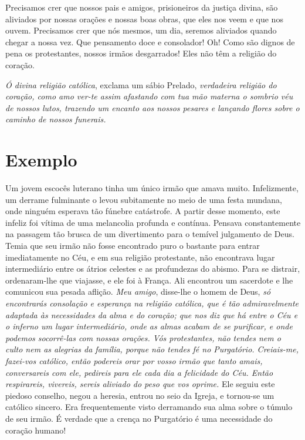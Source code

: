 Precisamos crer que nossos pais e amigos, prisioneiros da justiça divina, são aliviados por nossas orações e nossas boas obras, que eles nos veem e que nos ouvem. Precisamos crer que nós mesmos, um dia, seremos aliviados quando chegar a nossa vez. Que pensamento doce e consolador! Oh! Como são dignos de pena os protestantes, nossos irmãos desgarrados! Eles não têm a religião do coração.

\textit{Ó divina religião católica}, exclama um sábio Prelado, \textit{verdadeira religião do coração, como amo ver-te assim afastando com tua mão materna o sombrio véu de nossos lutos, trazendo um encanto aos nossos pesares e lançando flores sobre o caminho de nossos funerais.}


\section*{Exemplo}

Um jovem escocês luterano tinha um único irmão que amava muito. Infelizmente, um derrame fulminante o levou subitamente no meio de uma festa mundana, onde ninguém esperava tão fúnebre catástrofe. A partir desse momento, este infeliz foi vítima de uma melancolia profunda e contínua. Pensava constantemente na passagem tão brusca de um divertimento para o temível julgamento de Deus. Temia que seu irmão não fosse encontrado puro o bastante para entrar imediatamente no Céu, e em sua religião protestante, não encontrava lugar intermediário entre os átrios celestes e as profundezas do abismo. Para se distrair, ordenaram-lhe que viajasse, e ele foi à França. Ali encontrou um sacerdote e lhe comunicou sua pesada aflição. \textit{Meu amigo}, disse-lhe o homem de Deus, \textit{só encontrarás consolação e esperança na religião católica, que é tão admiravelmente adaptada às necessidades da alma e do coração; que nos diz que há entre o Céu e o inferno um lugar intermediário, onde as almas acabam de se purificar, e onde podemos socorrê-las com nossas orações. Vós protestantes, não tendes nem o culto nem as alegrias da família, porque não tendes fé no Purgatório. Creiais-me, fazei-vos católico, então podereis orar por vosso irmão que tanto amais, conversareis com ele, pedireis para ele cada dia a felicidade do Céu. Então respirareis, vivereis, sereis aliviado do peso que vos oprime.} Ele seguiu este piedoso conselho, negou a heresia, entrou no seio da Igreja, e tornou-se um católico sincero. Era frequentemente visto derramando sua alma sobre o túmulo de seu irmão. É verdade que a crença no Purgatório é uma necessidade do coração humano!


